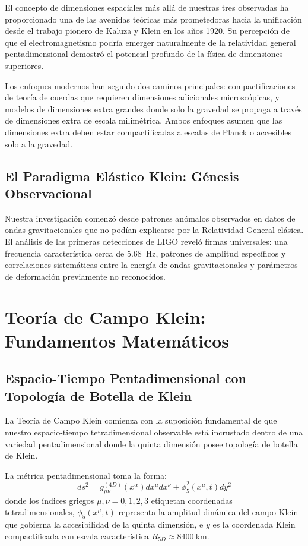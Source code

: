 \documentclass[aps,prl,twocolumn,showpacs,superscriptaddress,groupedaddress]{revtex4-1}
\newcommand{\phicinco}{\phi_5}
\newcommand{\Rcinco}{R_{5D}}
\begin{document}
El concepto de dimensiones espaciales más allá de nuestras tres observadas ha proporcionado una de las avenidas teóricas más prometedoras hacia la unificación desde el trabajo pionero de Kaluza y Klein en los años 1920. Su percepción de que el electromagnetismo podría emerger naturalmente de la relatividad general pentadimensional demostró el potencial profundo de la física de dimensiones superiores.

Los enfoques modernos han seguido dos caminos principales: compactificaciones de teoría de cuerdas que requieren dimensiones adicionales microscópicas, y modelos de dimensiones extra grandes donde solo la gravedad se propaga a través de dimensiones extra de escala milimétrica. Ambos enfoques asumen que las dimensiones extra deben estar compactificadas a escalas de Planck o accesibles solo a la gravedad.

\subsection{El Paradigma Elástico Klein: Génesis Observacional}

Nuestra investigación comenzó desde patrones anómalos observados en datos de ondas gravitacionales que no podían explicarse por la Relatividad General clásica. El análisis de las primeras detecciones de LIGO reveló firmas universales: una frecuencia característica cerca de \SI{5.68}{\hertz}, patrones de amplitud específicos y correlaciones sistemáticas entre la energía de ondas gravitacionales y parámetros de deformación previamente no reconocidos.

\section{\label{sec:teoria}Teoría de Campo Klein: Fundamentos Matemáticos}

\subsection{Espacio-Tiempo Pentadimensional con Topología de Botella de Klein}

La Teoría de Campo Klein comienza con la suposición fundamental de que nuestro espacio-tiempo tetradimensional observable está incrustado dentro de una variedad pentadimensional donde la quinta dimensión posee topología de botella de Klein.

La métrica pentadimensional toma la forma:
\begin{equation}
ds^2 = g_{\mu\nu}^{(4D)}(x^\alpha) dx^\mu dx^\nu + \phicinco^2(x^\mu, t) dy^2
\label{eq:metrica_5d}
\end{equation}
donde los índices griegos $\mu,\nu = 0,1,2,3$ etiquetan coordenadas tetradimensionales, $\phicinco(x^\mu, t)$ representa la amplitud dinámica del campo Klein que gobierna la accesibilidad de la quinta dimensión, e $y$ es la coordenada Klein compactificada con escala característica $\Rcinco \approx \SI{8400}{\kilo\meter}$.
\end{document}
